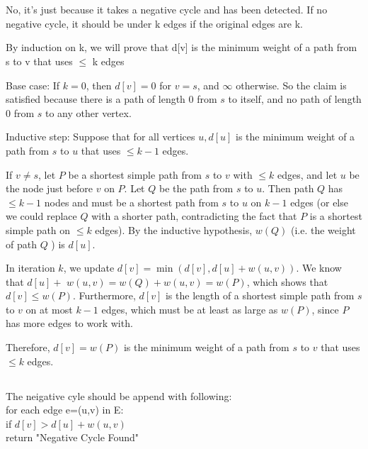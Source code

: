 \documentclass[a4paper]{article}
\begin{document}
\section{}
\subsection{}
No, it's just because it takes a negative cycle and has been detected. If no negative cycle, it should be under k edges if the original edges are k.

By induction on k, we will prove that d[v] is the minimum weight of a path
from s to v that uses $\leq$ k edges

Base case: If $k=0$, then $d[v]=0$ for $v=s$, and $\infty$ otherwise. So the claim is satisfied because there is a path of length 0 from $s$ to itself, and no path of length 0 from $s$ to any other vertex.

Inductive step: Suppose that for all vertices $u, d[u]$ is the minimum weight of a path from $s$ to $u$ that uses $\leq k-1$ edges.

If $v \neq s$, let $P$ be a shortest simple path from $s$ to $v$ with $\leq k$ edges, and let $u$ be the node just before $v$ on $P$. Let $Q$ be the path from $s$ to $u$. Then path $Q$ has $\leq k-1$ nodes and must be a shortest path from $s$ to $u$ on $k-1$ edges (or else we could replace $Q$ with a shorter path, contradicting the fact that $P$ is a shortest simple path on $\leq k$ edges). By the inductive hypothesis, $w(Q)$ (i.e. the weight of path $Q$ ) is $d[u]$.

In iteration $k$, we update $d[v]=\min \left(d[v], d[u]+w(u, v)\right)$. We know that $d[u]+$ $w(u, v)=w(Q)+w(u, v)=w(P)$, which shows that $d[v] \leq w(P)$. Furthermore, $d[v]$ is the length of a shortest simple path from $s$ to $v$ on at most $k-1$ edges, which must be at least as large as $w(P)$, since $P$ has more edges to work with.

Therefore, $d[v]=w(P)$ is the minimum weight of a path from $s$ to $v$ that uses $\leq k$ edges.
\subsection{}
The neigative cyle should be append with following:\\
for each edge e=(u,v) in E:\\
if $d[v]>d[u]+w(u,v)$\\
return "Negative Cycle Found"\\
\end{document}
